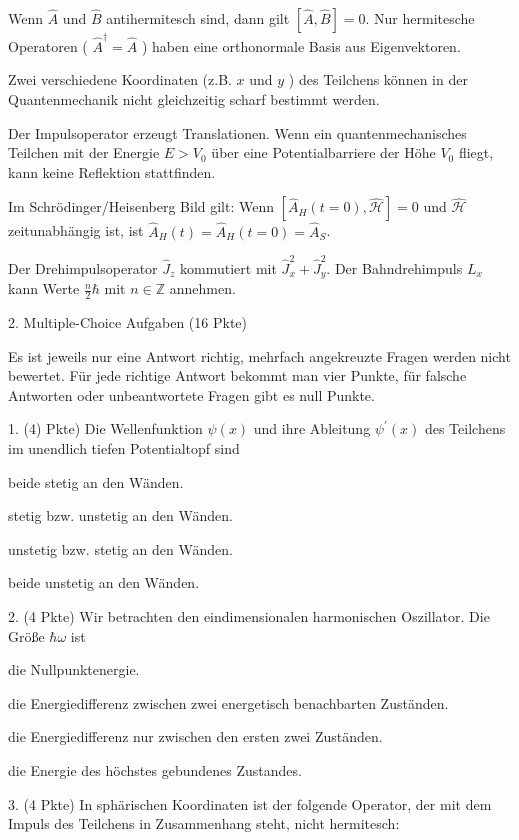\documentclass[11pt,a4paper]{article}
\begin{document}
Wenn $\hat{A}$ und $\hat{B}$ antihermitesch sind, dann gilt $[\hat{A}, \hat{B}]=0$.
Nur hermitesche Operatoren ( $\hat{A}^{\dagger}=\hat{A}$ ) haben eine orthonormale Basis aus Eigenvektoren.

Zwei verschiedene Koordinaten (z.B. $x$ und $y$ ) des Teilchens können in der Quantenmechanik nicht gleichzeitig scharf bestimmt werden.

Der Impulsoperator erzeugt Translationen.
Wenn ein quantenmechanisches Teilchen mit der Energie $E>V_0$ über eine Potentialbarriere der Höhe $V_0$ fliegt, kann keine Reflektion stattfinden.

Im Schrödinger/Heisenberg Bild gilt: Wenn $\left[\hat{A}_H(t=0), \hat{\mathcal{H}}\right]=0$ und $\hat{\mathcal{H}}$ zeitunabhängig ist, ist $\hat{A}_H(t)=\hat{A}_H(t=0)=\hat{A}_S$.

Der Drehimpulsoperator $\hat{J}_z$ kommutiert mit $\hat{J}_x^2+\hat{J}_y^2$.
Der Bahndrehimpuls $L_x$ kann Werte $\frac{n}{2} \hbar$ mit $n \in \mathbb{Z}$ annehmen.



2. Multiple-Choice Aufgaben (16 Pkte)

Es ist jeweils nur eine Antwort richtig, mehrfach angekreuzte Fragen werden nicht bewertet. Für jede richtige Antwort bekommt man vier Punkte, für falsche Antworten oder unbeantwortete Fragen gibt es null Punkte.

1. (4) Pkte) Die Wellenfunktion $\psi(x)$ und ihre Ableitung $\psi^{\prime}(x)$ des Teilchens im unendlich tiefen Potentialtopf sind

beide stetig an den Wänden.

stetig bzw. unstetig an den Wänden.

unstetig bzw. stetig an den Wänden.

beide unstetig an den Wänden.

2. (4 Pkte) Wir betrachten den eindimensionalen harmonischen Oszillator. Die Größe $\hbar \omega$ ist

die Nullpunktenergie.

die Energiedifferenz zwischen zwei energetisch benachbarten Zuständen.

die Energiedifferenz nur zwischen den ersten zwei Zuständen.

die Energie des höchstes gebundenes Zustandes.


3. (4 Pkte) In sphärischen Koordinaten ist der folgende Operator, der mit dem Impuls des Teilchens in Zusammenhang steht, nicht hermitesch:
\end{document}
